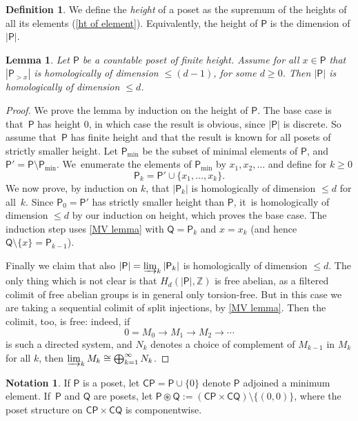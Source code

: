 \documentclass[11pt]{article}
\theoremstyle{plain}
\newtheorem{lem}[thm]{Lemma}
\theoremstyle{definition}
\newtheorem{defn}[thm]{Definition}
\newtheorem{notation}[thm]{Notation}
\let\altjoin\circledast
\newcommand{\Z}{\mathbb Z}
\newcommand{\Po}{\mathsf{P}}
\begin{document}
\begin{defn}We define the \emph{height} of a poset as the supremum of the heights of all its elements (\cref{ht of element}). Equivalently, the height of $\Po$ is the dimension of $|\Po|$.
\end{defn}

\begin{lem}\label{dimension lemma}
	Let $\Po$ be a countable poset of finite height. Assume for all $x \in \Po$ that $|\Po_{>x}|$ is homologically of dimension $\leq (d-1)$, for some $d \geq 0$. Then $|\Po|$ is homologically of dimension $\leq d$.
\end{lem}

\begin{proof}We prove the lemma by induction on the height of $\Po$. The base case is that~$\Po$ has height $0$, in which case the result is obvious, since $|\Po|$ is discrete. So assume that~$\Po$ has finite height and that the result is known for all posets of strictly smaller height. Let $\Po_{\min}$ be the subset of minimal elements of $\Po$, and $\Po' = \Po \setminus \Po_{\min}$. We~enumerate the elements of $\mathsf P_{\min}$ by $x_1,x_2,\ldots$ and define for $k \geq 0$
\[
\mathsf P_k = \mathsf P' \cup \{x_1,\dots,x_k\}.
\]
We now prove, by induction on $k$, that $|\Po_k|$ is homologically of dimension $\leq d$ for all~$k$. Since $\Po_0=\Po'$ has strictly smaller height than $\Po$, it~is homologically of dimension $\leq d$ by our induction on height, which proves the base case. The induction step uses \cref{MV lemma} with $\mathsf Q= \Po_k$ and $x=x_k$ (and hence $\mathsf Q \setminus \{x\} = \Po_{k-1}$).

Finally we claim that also $|\Po| = \varinjlim_k |\Po_k|$ is homologically of dimension $\leq d$. The only thing which is not clear is that $H_d(|\Po|,\Z)$ is free abelian, as a filtered colimit of free abelian groups is in general only torsion-free. But in this case we are taking a sequential colimit of split injections, by \cref{MV lemma}. Then the colimit, too, is free: indeed, if
\[
0 = M_0 \to M_1 \to M_2 \to \cdots
\]
is such a directed system, and $N_k$ denotes a choice of complement of $M_{k-1}$ in $M_k$ for all $k$, then $\varinjlim_k M_k \cong \bigoplus_{k=1}^\infty N_k$. \end{proof}

\begin{notation}\label{notation:join}If $\Po$ is a poset, let $\mathsf C \Po = \Po \cup \{0\}$ denote $\Po$ adjoined a minimum element. If~$\mathsf P$ and $\mathsf Q$ are posets, let $\mathsf P \altjoin \mathsf Q := (\mathsf{CP} \times \mathsf{CQ}) \setminus \{(0,0)\}$, where the poset structure on $\mathsf{CP} \times \mathsf{CQ}$ is componentwise.
\end{notation}
\end{document}
